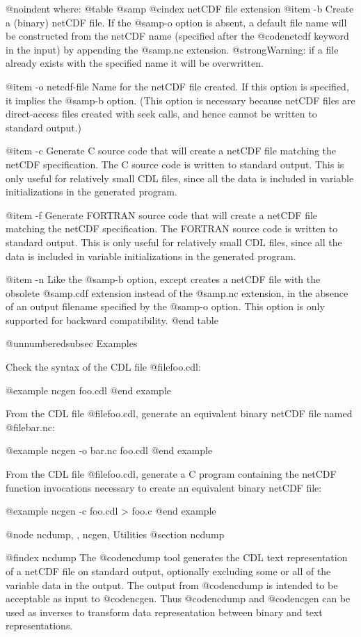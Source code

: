 {@noindent
where:
@table @samp
@cindex netCDF file extension
@item -b
Create a (binary) netCDF file.  If the @samp{-o} option is absent, a
default file name will be constructed from the netCDF name (specified
after the @code{netcdf} keyword in the input) by appending the
@samp{.nc} extension.  @strong{Warning:  if a file already exists with
the specified name it will be overwritten}.

@item -o netcdf-file
Name for the netCDF file created.  If this option is specified, it
implies the @samp{-b} option.  (This option is necessary because netCDF
files are direct-access files created with seek calls, and
hence cannot be written to standard output.)

@item -c
Generate C source code that will create a netCDF file matching the
netCDF specification.  The C source code is written to standard output.
This is only useful for relatively small CDL files, since all the data
is included in variable initializations in the generated program.

@item -f
Generate FORTRAN source code that will create a netCDF file matching the
netCDF specification.  The FORTRAN source code is written to standard
output.
This is only useful for relatively small CDL files, since all the data
is included in variable initializations in the generated program.

@item -n
Like the @samp{-b} option, except creates a netCDF file with the
obsolete @samp{.cdf} extension instead of the @samp{.nc} extension, in
the absence of an output filename specified by the @samp{-o} option.
This option is only supported for backward compatibility.
@end table

@unnumberedsubsec Examples

Check the syntax of the CDL file @file{foo.cdl}:

@example
ncgen foo.cdl
@end example

From the CDL file @file{foo.cdl}, generate an equivalent binary netCDF file
named @file{bar.nc}:

@example
ncgen -o bar.nc foo.cdl
@end example

From the CDL file @file{foo.cdl}, generate a C program containing the
netCDF function invocations necessary to create an equivalent binary netCDF
file:

@example
ncgen -c foo.cdl > foo.c
@end example

@node ncdump,  , ncgen, Utilities
@section ncdump

@findex ncdump
The @code{ncdump} tool generates the CDL text representation of a netCDF
file on standard output, optionally excluding some or all of the
variable data in the output.  The output from @code{ncdump} is intended
to be acceptable as input to @code{ncgen}.  Thus @code{ncdump} and
@code{ncgen} can be used as inverses to transform data representation
between binary and text representations.

}
